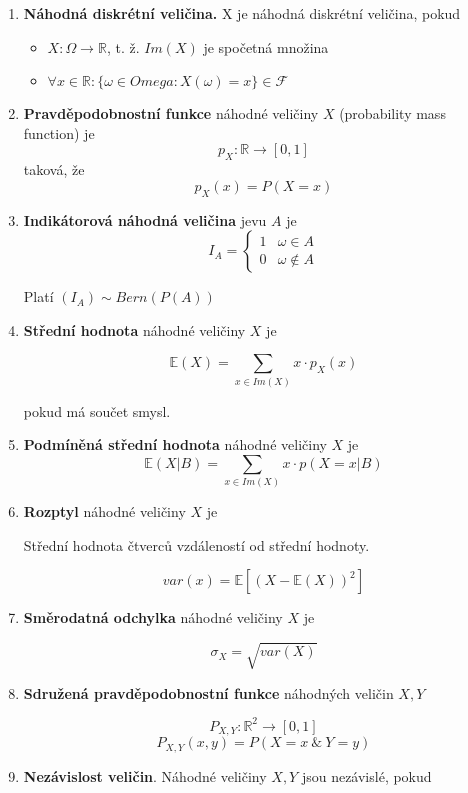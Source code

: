 \documentclass[10pt,a4paper]{article}
\theoremstyle{plain}
\theoremstyle{definition}
\begin{document}
\begin{enumerate}
\item \textbf{Náhodná diskrétní veličina.} X je náhodná diskrétní veličina, pokud

\begin{itemize}
\item $X: \Omega \to \mathbb{R}$, t. ž. $Im(X)$ je spočetná množina
\item $\forall x \in \mathbb{R}: \{\omega \in Omega: X(\omega) = x \} \in \mathcal{F}$
\end{itemize}

\item \textbf{Pravděpodobnostní funkce} náhodné veličiny $X$ (probability mass function) je \[p_X: \mathbb{R} \to [0,1] \]
taková, že  
\[ p_X(x) = P(X = x) \]

\item \textbf{Indikátorová náhodná veličina} jevu $A$ je 
\[ I_A = \begin{cases} 1 & \omega \in A \\ 0 & \omega \notin A \end{cases}\]

Platí $(I_A) \sim Bern(P(A))$

\item \textbf{Střední hodnota} náhodné veličiny $X$ je

\[ \mathbb{E}(X) = \sum_{x \in Im(X)} x \cdot p_X(x)\]

pokud má součet smysl.

\item \textbf{Podmíněná střední hodnota} náhodné veličiny $X$ je
\[ \mathbb{E}(X|B) = \sum_{x \in Im(X)} x \cdot p(X = x|B)\]

\item \textbf{Rozptyl} náhodné veličiny $X$ je

Střední hodnota čtverců vzdáleností od střední hodnoty.

\[ var(x) = \mathbb{E}\left[(X-\mathbb{E}(X))^2 \right] \]

\item\textbf{Směrodatná odchylka} náhodné veličiny $X$ je

\[ \sigma_X = \sqrt{var(X)} \]

\item \textbf{Sdružená pravděpodobnostní funkce} náhodných veličin $X,Y$

\[ P_{X,Y}: \mathbb{R}^2 \to [0,1]\]
\[ P_{X,Y}(x,y) = P(X = x \  \& \  Y = y)\]

\item \textbf{Nezávislost veličin}. Náhodné veličiny $X,Y$ jsou nezávislé, pokud


\end{enumerate}
\end{document}
